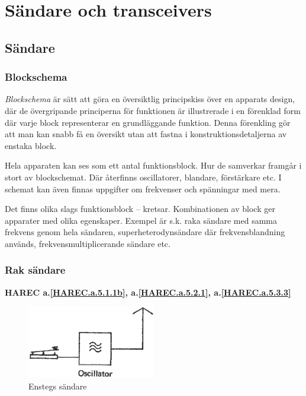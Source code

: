 \chapter[Sändare]{Sändare och transceivers}

\section{Sändare}
\label{sändare}

\subsection{Blockschema}

\emph{Blockschema} är sätt att göra en översiktlig principskiss över en
apparats design, där de övergripande principerna för funktionen är illustrerade
i en förenklad form där varje block representerar en grundläggande funktion.
Denna förenkling gör att man kan snabb få en översikt utan att fastna i
konstruktionsdetaljerna av enstaka block.

Hela apparaten kan ses som ett antal funktionsblock. Hur de samverkar
framgår i stort av blockschemat.
Där återfinns oscillatorer, blandare, förstärkare etc.
I schemat kan även finnas uppgifter om frekvenser och spänningar med mera.

Det finns olika slags funktionsblock -- kretsar. Kombinationen av block
ger apparater med olika egenskaper.
Exempel är s.k. raka sändare med samma frekvens genom hela sändaren,
superheterodynsändare där frekvensblandning används,
frekvensmultiplicerande sändare etc.

\subsection{Rak sändare}
\textbf{HAREC
  a.\ref{HAREC.a.5.1.1b}\label{myHAREC.a.5.1.1b},
  a.\ref{HAREC.a.5.2.1}\label{myHAREC.a.5.2.1},
  a.\ref{HAREC.a.5.3.3}\label{myHAREC.a.5.3.3}
}

\begin{figure}
  \includegraphics[width=0.5\textwidth]{images/cropped_pdfs/bild_2_5-01.pdf}
  \caption{Enstegs sändare}
  \label{fig:bildII5-1}
\end{figure}

